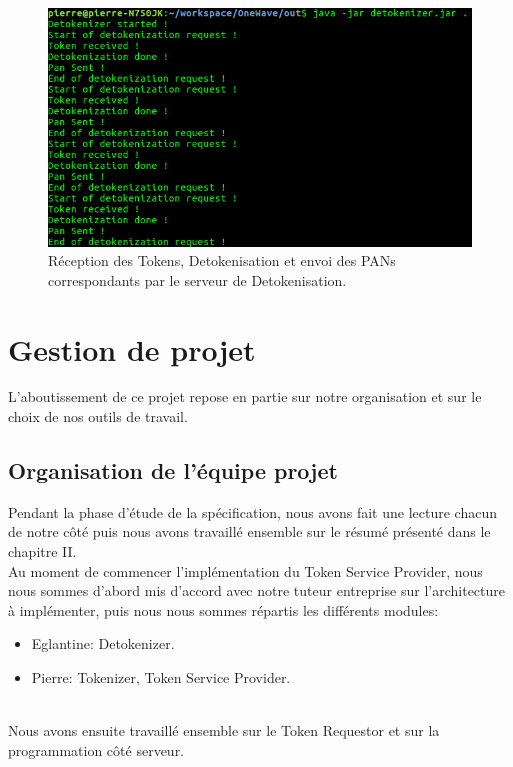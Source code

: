 \documentclass{report}
\begin{document}
\begin{figure}[!ht]
    \centering
			\includegraphics[scale=0.47]{img/serveur_detokenizer.png}
			\caption{\label{Trello} Réception des Tokens, Detokenisation et envoi des PANs correspondants par le serveur de Detokenisation.}			
\end{figure}


\chapter{Gestion de projet}
L'aboutissement de ce projet repose en partie sur notre organisation et sur le choix de nos outils de travail. 

\section{Organisation de l'équipe projet}
Pendant la phase d'étude de la spécification, nous avons fait une lecture chacun de notre côté puis nous avons travaillé ensemble sur le résumé présenté dans le chapitre II.\\
Au moment de commencer l'implémentation du Token Service Provider, nous nous sommes d'abord mis d'accord avec notre tuteur entreprise sur l'architecture à implémenter, puis nous nous sommes répartis les différents modules:\\

\begin{itemize}
	\item Eglantine: Detokenizer.
	\item Pierre: Tokenizer, Token Service Provider.
\end{itemize}

~\\
\noindent
Nous avons ensuite travaillé ensemble sur le Token Requestor et sur la programmation côté serveur.
\end{document}
